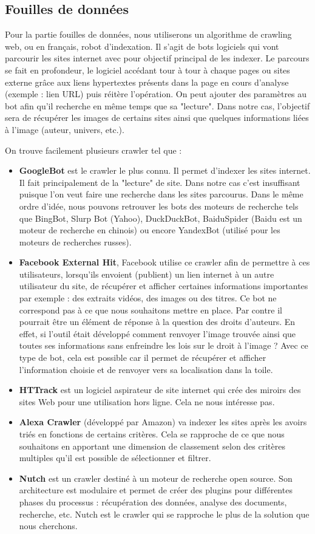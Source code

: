 \documentclass[a4paper,12pt]{article}
\begin{document}
\subsection{Fouilles de données}
Pour la partie fouilles de données, nous utiliserons un algorithme de crawling web, ou en français, robot d'indexation.
Il s’agit de bots logiciels qui vont parcourir les sites internet avec
pour objectif principal de les indexer. Le parcours se fait en profondeur, le
logiciel accédant tour à tour à chaque pages ou sites externe grâce aux liens
hypertextes présents dans la page en cours d’analyse (exemple : lien URL) puis
réitère l’opération. On peut ajouter des paramètres au bot afin qu’il recherche
en même temps que sa "lecture". Dans notre cas, l'objectif sera de récupérer les images de certains sites ainsi que quelques informations liées à l'image (auteur, univers, etc.).

On trouve facilement plusieurs crawler tel que :
\begin{itemize}
    \item \textbf{GoogleBot} est le crawler le plus connu. Il permet d’indexer les sites
internet. Il fait principalement de la "lecture" de site. Dans notre cas c'est insuffisant puisque l'on veut faire une recherche dans les sites parcourus. 
Dans le même ordre d’idée, nous pouvons retrouver les bots des moteurs
de recherche tels que BingBot, Slurp Bot (Yahoo), DuckDuckBot,
BaiduSpider (Baidu est un moteur de recherche en chinois) ou encore
YandexBot (utilisé pour les moteurs de recherches russes).
\item \textbf{Facebook External Hit}, Facebook utilise ce crawler afin de permettre
à ces utilisateurs, lorsqu’ils envoient (publient) un lien internet
à un autre utilisateur du site, de récupérer et afficher certaines
informations importantes par exemple : des extraits vidéos,
des images ou des titres.
Ce bot ne correspond pas à ce que nous souhaitons mettre en place.
Par contre il pourrait être un élément de réponse à la question des
droits d’auteurs. En effet, si l’outil était développé comment
renvoyer l’image trouvée ainsi que toutes ses informations sans
enfreindre les lois sur le droit à l’image ? Avec ce type de bot, cela est
possible car il permet de récupérer et afficher l’information choisie et
de renvoyer vers sa localisation dans la toile.
\item \textbf{HTTrack} est un logiciel aspirateur de site internet qui crée des miroirs des sites Web pour une utilisation hors ligne. Cela ne nous intéresse pas. 
\item \textbf{Alexa Crawler} (développé par Amazon) va indexer les sites après
les avoirs triés en fonctions de certains critères. Cela se rapproche de ce que nous souhaitons en apportant une dimension de classement selon des critères multiples qu’il est possible de sélectionner et filtrer.
\item \textbf{Nutch} est un crawler destiné à un moteur de recherche open source.
Son architecture est modulaire et permet de créer des plugins pour différentes phases du processus : récupération des données, analyse des documents, recherche, etc. Nutch est le crawler qui se rapproche le plus de la solution que nous
cherchons.
\end{itemize} 
\end{document}
